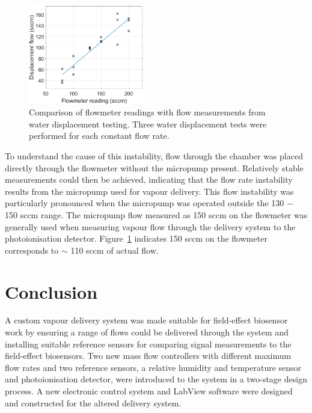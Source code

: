 \documentclass[
  a4paper,
]{scrbook}
\begin{document}
\begin{figure}

{\centering \includegraphics[width=0.45\textwidth,height=\textheight]{figures/ch8/PID_flowmeter.png}

}

\caption[Calibration curves showing the flowmeter readings relative to
flow measurements from water displacement
testing.]{\label{fig-flowmeter-calibration}Comparison of flowmeter
readings with flow measurements from water displacement testing. Three
water displacement tests were performed for each constant flow rate.}

\end{figure}

To understand the cause of this instability, flow through the chamber
was placed directly through the flowmeter without the micropump present.
Relatively stable measurements could then be achieved, indicating that
the flow rate instability results from the micropump used for vapour
delivery. This flow instability was particularly pronounced when the
micropump was operated outside the 130 \(-\) 150 sccm range. The
micropump flow measured as 150 sccm on the flowmeter was generally used
when measuring vapour flow through the delivery system to the
photoionisation detector. Figure~\ref{fig-flowmeter-calibration}
indicates 150 sccm on the flowmeter corresponds to \(\sim\) 110 sccm of
actual flow.

\hypertarget{conclusion-2}{%
\section{Conclusion}\label{conclusion-2}}

A custom vapour delivery system was made suitable for field-effect
biosensor work by ensuring a range of flows could be delivered through
the system and installing suitable reference sensors for comparing
signal measurements to the field-effect biosensors. Two new mass flow
controllers with different maximum flow rates and two reference sensors,
a relative humidity and temperature sensor and photoionisation detector,
were introduced to the system in a two-stage design process. A new
electronic control system and LabView software were designed and
constructed for the altered delivery system.
\end{document}
